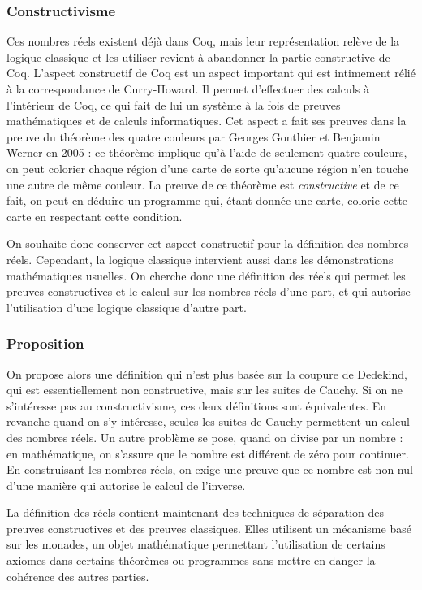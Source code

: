 \documentclass[11pt]{article}
\begin{document}
\subsubsection{Constructivisme}

Ces nombres réels existent déjà dans Coq, mais leur représentation relève de la
logique classique et les utiliser revient à abandonner la partie constructive de
Coq. L'aspect constructif de Coq est un aspect important qui est intimement rélié
à la correspondance de Curry-Howard. Il permet d'effectuer des calculs à l'intérieur
de Coq, ce qui fait de lui un système à la fois de preuves mathématiques et de
calculs informatiques. Cet aspect a fait ses preuves dans la preuve du théorème
des quatre couleurs par Georges Gonthier et Benjamin Werner en 2005 : ce théorème
implique qu'à l'aide de seulement quatre couleurs, on peut colorier chaque région
d'une carte de sorte qu'aucune région n'en touche une autre de même couleur. La
preuve de ce théorème est \emph{constructive} et de ce fait, on peut en déduire
un programme qui, étant donnée une carte, colorie cette carte en respectant cette
condition.

On souhaite donc conserver cet aspect constructif pour la définition des nombres
réels. Cependant, la logique classique intervient aussi dans les démonstrations
mathématiques usuelles. On cherche donc une définition des réels qui permet les
preuves constructives et le calcul sur les nombres réels d'une part, et qui autorise
l'utilisation d'une logique classique d'autre part.

\subsubsection{Proposition}

On propose alors une définition qui n'est plus basée sur la coupure de Dedekind,
qui est essentiellement non constructive, mais sur les suites de Cauchy. Si on ne
s'intéresse pas au constructivisme, ces deux définitions sont équivalentes. En
revanche quand on s'y intéresse, seules les suites de Cauchy permettent un calcul
des nombres réels. Un autre problème se pose, quand on divise par un nombre : en
mathématique, on s'assure que le nombre est différent de zéro pour continuer.
En construisant les nombres réels, on exige une preuve que ce nombre est non nul
d'une manière qui autorise le calcul de l'inverse.

La définition des réels contient maintenant des techniques de séparation des preuves
constructives et des preuves classiques. Elles utilisent un mécanisme basé sur les
monades, un objet mathématique permettant l'utilisation de certains axiomes dans
certains théorèmes ou programmes sans mettre en danger la cohérence des autres parties.
\end{document}
